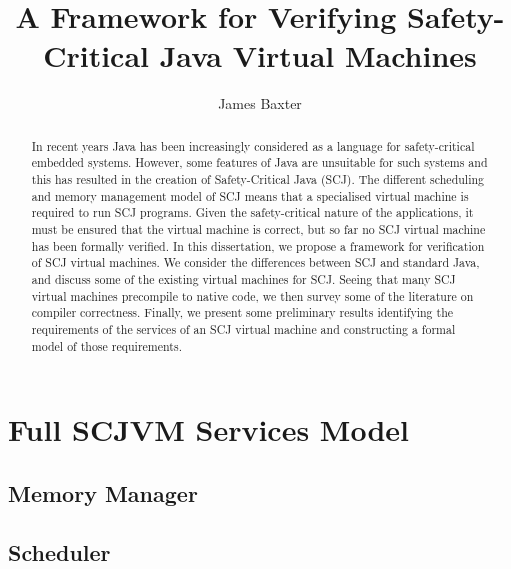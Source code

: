 \documentclass[a4paper,10pt]{report}
\title{A Framework for Verifying Safety-Critical Java Virtual Machines}
\author{James Baxter}
\date{}
\newif\ifFullModel
\begin{document}
\maketitle

\begin{abstract}
  In recent years Java has been increasingly considered as a language
  for safety-critical embedded systems.
  However, some features of Java are unsuitable for such systems and
  this has resulted in the creation of Safety-Critical Java (SCJ).
  The different scheduling and memory management model of SCJ means
  that a specialised virtual machine is required to run SCJ programs.
  Given the safety-critical nature of the applications, it must be
  ensured that the virtual machine is correct, but so far no SCJ
  virtual machine has been formally verified.
  In this dissertation, we propose a framework for verification of SCJ
  virtual machines.
  We consider the differences between SCJ and standard Java, and
  discuss some of the existing virtual machines for SCJ.
  Seeing that many SCJ virtual machines precompile to native code, we
  then survey some of the literature on compiler correctness.
  Finally, we present some preliminary results identifying the
  requirements of the services of an SCJ virtual machine and
  constructing a formal model of those requirements.
\end{abstract}

\tableofcontents











{\raggedright \printbibliography}

\appendix

\chapter{Full SCJVM Services Model}
\label{full-scjvm-services-model}
\FullModeltrue
\section{Memory Manager}


\section{Scheduler}

\end{document}

